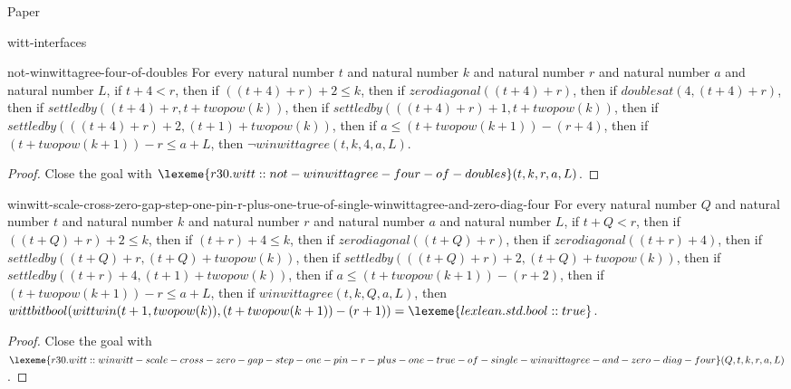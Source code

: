 \begin{lexlean}{Paper}
\begin{section}{witt-interfaces}
  \begin{theorem}{not-winwittagree-four-of-doubles}
  For every natural number \(t\) and natural number \(k\) and natural number \(r\) and natural number \(a\) and natural number \(L\), if \(t + 4 < r\), then if \(((t + 4) + r) + 2 ≤ k\), then if \(zerodiagonal((t + 4) + r)\), then if \(doublesat(4, (t + 4) + r)\), then if \(settledby((t + 4) + r, t + twopow(k))\), then if \(settledby(((t + 4) + r) + 1, t + twopow(k))\), then if \(settledby(((t + 4) + r) + 2, (t + 1) + twopow(k))\), then if \(a ≤ (t + twopow(k + 1)) - (r + 4)\), then if \((t + twopow(k + 1)) - r ≤ a + L\), then \(¬ winwittagree(t, k, 4, a, L)\).
  \begin{proof}
  Close the goal with \(\lexeme{r30.witt::not-winwittagree-four-of-doubles}(t, k, r, a, L)\).
  \end{proof}
  \end{theorem}

  \begin{theorem}{winwitt-scale-cross-zero-gap-step-one-pin-r-plus-one-true-of-single-winwittagree-and-zero-diag-four}
  For every natural number \(Q\) and natural number \(t\) and natural number \(k\) and natural number \(r\) and natural number \(a\) and natural number \(L\), if \(t + Q < r\), then if \(((t + Q) + r) + 2 ≤ k\), then if \((t + r) + 4 ≤ k\), then if \(zerodiagonal((t + Q) + r)\), then if \(zerodiagonal((t + r) + 4)\), then if \(settledby((t + Q) + r, (t + Q) + twopow(k))\), then if \(settledby(((t + Q) + r) + 2, (t + Q) + twopow(k))\), then if \(settledby((t + r) + 4, (t + 1) + twopow(k))\), then if \(a ≤ (t + twopow(k + 1)) - (r + 2)\), then if \((t + twopow(k + 1)) - r ≤ a + L\), then if \(winwittagree(t, k, Q, a, L)\), then \(wittbitbool(wittwin(t + 1, twopow(k)), (t + twopow(k + 1)) - (r + 1)) = \lexeme{lexlean.std.bool::true}\).
  \begin{proof}
  Close the goal with \(\lexeme{r30.witt::winwitt-scale-cross-zero-gap-step-one-pin-r-plus-one-true-of-single-winwittagree-and-zero-diag-four}(Q, t, k, r, a, L)\).
  \end{proof}
  \end{theorem}


\end{section}
\end{lexlean}
